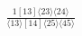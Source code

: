 \documentclass[varwidth, border=5pt]{standalone}
\begin{document}
\begin{my}
$\begin{gathered}
\scriptscriptstyle\frac{1[13]⟨23⟩⟨24⟩}{⟨13⟩[14]⟨25⟩⟨45⟩}
\end{gathered}$
\end{my}
\end{document}
